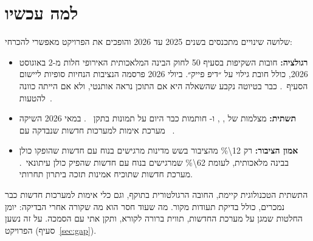 \section{למה עכשיו}
שלושה שינויים מתכנסים בשנים \num{2025} עד \num{2026} והופכים את הפרויקט מאפשרי להכרחי:
\begin{itemize}
\item \textbf{רגולציה:} חובות השקיפות בסעיף \num{50} לחוק הבינה המלאכותית האירופי חלות מ-\num{2} באוגוסט \num{2026}, כולל חובת גילוי על ״דיפ פייק״. ביולי \num{2026} פרסמה הנציבות הנחיות סופיות ליישום הסעיף~\cite{euaiact2026}. כבר בטיוטה נקבע שהשאלה היא אם התוכן נראה אותנטי, ולא אם הייתה כוונה להטעות~\cite{gtlaw2026}.
\item \textbf{תשתית:} מצלמות של , ,  ו- חותמות כבר היום על תמונות בתקן ~\cite{c2pa2026}. במאי \num{2026} השיקה  מערכת אימות למערכות חדשות שנבדקה עם ~\cite{canon2026}.
\item \textbf{אמון הציבור:} רק \num{12\%} מהציבור בשש מדינות מרגישים בנוח עם חדשות שהופקו כולן בבינה מלאכותית, לעומת \num{62\%} שמרגישים בנוח עם חדשות שהפיק כולן עיתונאי~\cite{reuters2025}. מערכת חדשות שתוכיח אמינות תזכה ביתרון תחרותי.
\end{itemize}

\begin{keybox}[מסקנה]
התשתית הטכנולוגית קיימת, החובה הרגולטורית בתוקף, וגם כלי אימות למערכות חדשות כבר נמכרים, כולל בדיקת תעודות מקור. מה שעוד חסר הוא מה שקורה אחרי הבדיקה: יומן החלטות שמגן על מערכת החדשות, תווית ברורה לקורא, ותקן אתי עם הסמכה. על זה נשען הפרויקט (סעיף~\ref{sec:gap}).
\end{keybox}
